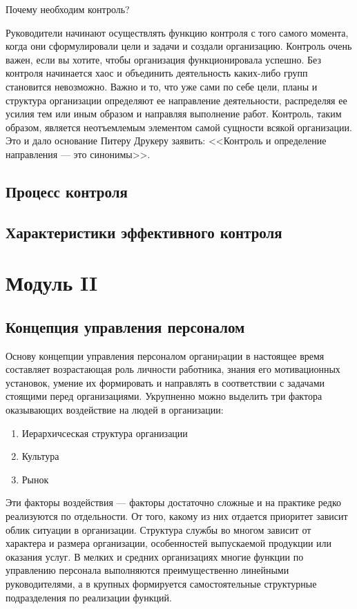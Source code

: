 \documentclass[a4paper,12pt,oneside,final]{extarticle}
\numberwithin{equation}{section}
\begin{document}
Почему необходим контроль?

Руководители начинают осуществлять функцию контроля с того самого момента, когда они сформулировали цели и задачи и создали организацию. 
Контроль очень важен, если вы хотите, чтобы организация функционировала успешно. 
Без контроля начинается хаос и объединить деятельность каких-либо групп становится невозможно. 
Важно и то, что уже сами по себе цели, планы и структура организации определяют ее направление деятельности, распределяя ее усилия тем или иным образом и направляя выполнение работ. Контроль, таким образом, является неотъемлемым элементом самой сущности всякой организации. 
Это и дало основание Питеру Друкеру заявить: <<Контроль и определение направления --- это синонимы>>.

\subsection{Процесс контроля}



\subsection{Характеристики эффективного контроля}

%
%
\section{Модуль II}
\subsection{Концепция управления персоналом}
Основу концепции управления персоналом органиpации в настоящее время составляет возрастающая роль личности работника, знания его мотивационных установок, умение их формировать и направлять в соответствии с задачами стоящими перед организациями. 
Укрупненно можно выделить три фактора оказывающих воздействие на людей в организации:
\begin{enumerate}
	\item Иерархичсеская структура организации
	\item Культура
	\item Рынок
\end{enumerate}
Эти факторы воздействия --- факторы достаточно сложные и на практике редко реализуются по отдельности. 
От того, какому из них отдается приоритет зависит облик ситуации в организации.
Структура службы во многом зависит от характера и размера организации, особенностей выпускаемой продукции или оказания услуг.
В мелких и средних организациях многие функции по управлению персонала выполняются преимущественно линейными руководителями, а в крупных формируется самостоятельные структурные подразделения по реализации функций.
\end{document}
